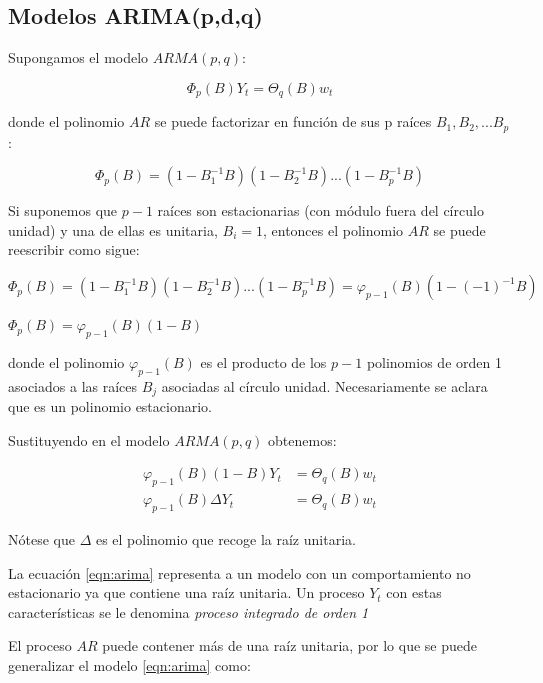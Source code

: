 \documentclass[a4paper,10pt]{article}
\begin{document}
\subsection{Modelos ARIMA(p,d,q)}

Supongamos el modelo $ARMA(p,q)$:

\begin{equation*}
\Phi_p (B) Y_t = \Theta_q (B) w_t
\end{equation*}

donde el polinomio $AR$ se puede factorizar en función de sus p raíces $B_1,B_2,...B_p$:

\begin{equation*}
\Phi_p (B) = (1-B_1^{-1}B)(1-B_2^{-1}B)...(1-B_p^{-1}B)
\end{equation*}

Si suponemos que $p-1$ raíces son estacionarias (con módulo fuera del círculo unidad) y una de ellas es unitaria, $B_i = 1$, entonces el polinomio $AR$ se puede reescribir como sigue:

\begin{center}
$\Phi_p (B) = (1-B_1^{-1}B)(1-B_2^{-1}B)...(1-B_p^{-1}B) = \varphi_{p-1} (B) (1-(-1)^{-1}B)$

$\Phi_p(B) = \varphi_{p-1} (B) (1-B)$
\end{center}

donde el polinomio $\varphi_{p-1}(B)$ es el producto de los $p-1$ polinomios de orden 1 asociados a las raíces $B_j$ asociadas al círculo unidad. Necesariamente se aclara que es un polinomio estacionario.

Sustituyendo en el modelo $ARMA(p,q)$ obtenemos:

\begin{equation}\label{eqn:arima}
\begin{split}
\varphi_{p-1}(B) (1-B) Y_t &= \Theta_q (B) w_t \\
\varphi_{p-1}(B) \Delta Y_t &= \Theta_q (B) w_t
\end{split}
\end{equation}

Nótese que $\Delta$ es el polinomio que recoge la raíz unitaria.

La ecuación \ref{eqn:arima} representa a un modelo con un comportamiento no estacionario ya que contiene una raíz unitaria. Un proceso $Y_t$ con estas características se le denomina \textit{proceso integrado de orden 1  }

El proceso $AR$ puede contener más de una raíz unitaria, por lo que se puede generalizar el modelo \ref{eqn:arima} como:
\end{document}
